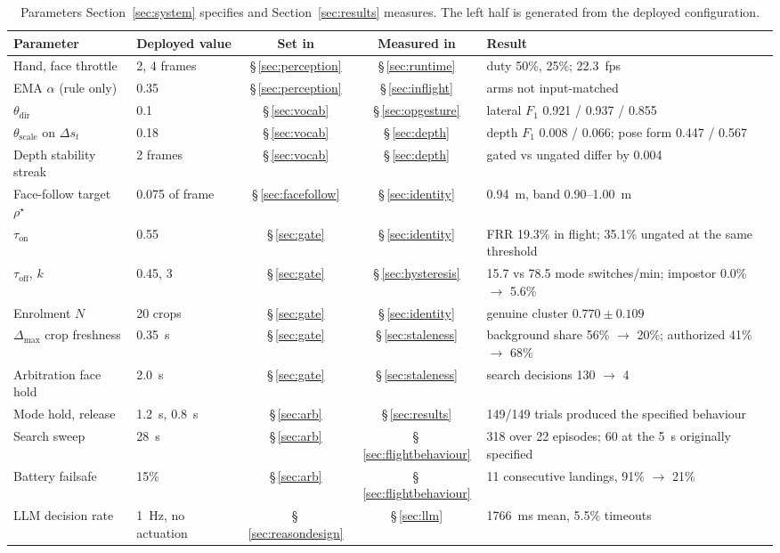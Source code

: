 \begin{table}[t]
\caption{Parameters Section~\ref{sec:system} specifies and Section~\ref{sec:results} measures. The left half is generated from the deployed configuration.}
\label{tab:design}
\centering
\footnotesize
\setlength{\tabcolsep}{5pt}
\renewcommand{\arraystretch}{1.05}
\begin{tabular}{@{}llccl@{}}
\toprule
Parameter & Deployed value & Set in & Measured in & Result \\
\midrule
Hand, face throttle & 2, 4 frames & \S\,\ref{sec:perception} & \S\,\ref{sec:runtime} & duty 50\%, 25\%; 22.3~fps \\
EMA $\alpha$ (rule only) & 0.35 & \S\,\ref{sec:perception} & \S\,\ref{sec:inflight} & arms not input-matched \\
$\theta_{\mathrm{dir}}$ & 0.1 & \S\,\ref{sec:vocab} & \S\,\ref{sec:opgesture} & lateral $F_1$ 0.921 / 0.937 / 0.855 \\
$\theta_{\mathrm{scale}}$ on $\Delta s_t$ & 0.18 & \S\,\ref{sec:vocab} & \S\,\ref{sec:depth} & depth $F_1$ 0.008 / 0.066; pose form 0.447 / 0.567 \\
Depth stability streak & 2 frames & \S\,\ref{sec:vocab} & \S\,\ref{sec:depth} & gated vs ungated differ by 0.004 \\
Face-follow target $\rho^{\star}$ & 0.075 of frame & \S\,\ref{sec:facefollow} & \S\,\ref{sec:identity} & 0.94~m, band 0.90--1.00~m \\
$\tau_{\mathrm{on}}$ & 0.55 & \S\,\ref{sec:gate} & \S\,\ref{sec:identity} & FRR 19.3\% in flight; 35.1\% ungated at the same threshold \\
$\tau_{\mathrm{off}}$, $k$ & 0.45, 3 & \S\,\ref{sec:gate} & \S\,\ref{sec:hysteresis} & 15.7 vs 78.5 mode switches/min; impostor 0.0\% $\to$ 5.6\% \\
Enrolment $N$ & 20 crops & \S\,\ref{sec:gate} & \S\,\ref{sec:identity} & genuine cluster $0.770\pm0.109$ \\
$\Delta_{\max}$ crop freshness & 0.35~s & \S\,\ref{sec:gate} & \S\,\ref{sec:staleness} & background share 56\% $\to$ 20\%; authorized 41\% $\to$ 68\% \\
Arbitration face hold & 2.0~s & \S\,\ref{sec:gate} & \S\,\ref{sec:staleness} & search decisions 130 $\to$ 4 \\
Mode hold, release & 1.2~s, 0.8~s & \S\,\ref{sec:arb} & \S\,\ref{sec:results} & 149/149 trials produced the specified behaviour \\
Search sweep & 28~s & \S\,\ref{sec:arb} & \S\,\ref{sec:flightbehaviour} & 318\textdegree{} over 22 episodes; 60\textdegree{} at the 5~s originally specified \\
Battery failsafe & 15\% & \S\,\ref{sec:arb} & \S\,\ref{sec:flightbehaviour} & 11 consecutive landings, 91\% $\to$ 21\% \\
LLM decision rate & 1~Hz, no actuation & \S\,\ref{sec:reasondesign} & \S\,\ref{sec:llm} & 1766~ms mean, 5.5\% timeouts \\
\bottomrule
\end{tabular}
\end{table}

